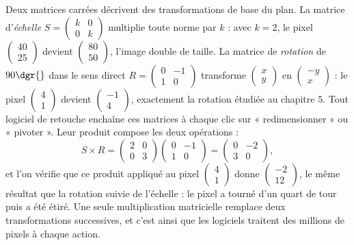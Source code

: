 \begin{exemple}
Deux matrices carrées décrivent des transformations de base du plan. La matrice d'\emph{échelle} $S = \begin{pmatrix} k & 0 \\ 0 & k \end{pmatrix}$ multiplie toute norme par $k$ : avec $k = 2$, le pixel $\begin{pmatrix} 40 \\ 25 \end{pmatrix}$ devient $\begin{pmatrix} 80 \\ 50 \end{pmatrix}$, l'image double de taille. La matrice de \emph{rotation} de $90\dgr{}$ dans le sens direct $R = \begin{pmatrix} 0 & -1 \\ 1 & 0 \end{pmatrix}$ transforme $\begin{pmatrix} x \\ y \end{pmatrix}$ en $\begin{pmatrix} -y \\ x \end{pmatrix}$ : le pixel $\begin{pmatrix} 4 \\ 1 \end{pmatrix}$ devient $\begin{pmatrix} -1 \\ 4 \end{pmatrix}$, exactement la rotation étudiée au chapitre 5. Tout logiciel de retouche enchaîne ces matrices à chaque clic sur « redimensionner » ou « pivoter ». Leur produit compose les deux opérations :
\[
S \times R = \begin{pmatrix} 2 & 0 \\ 0 & 3 \end{pmatrix}
\begin{pmatrix} 0 & -1 \\ 1 & 0 \end{pmatrix}
= \begin{pmatrix} 0 & -2 \\ 3 & 0 \end{pmatrix} ,
\]
et l'on vérifie que ce produit appliqué au pixel $\begin{pmatrix} 4 \\ 1 \end{pmatrix}$ donne $\begin{pmatrix} -2 \\ 12 \end{pmatrix}$, le même résultat que la rotation suivie de l'échelle : le pixel a tourné d'un quart de tour puis a été étiré. Une seule multiplication matricielle remplace deux transformations successives, et c'est ainsi que les logiciels traitent des millions de pixels à chaque action.
\end{exemple}

